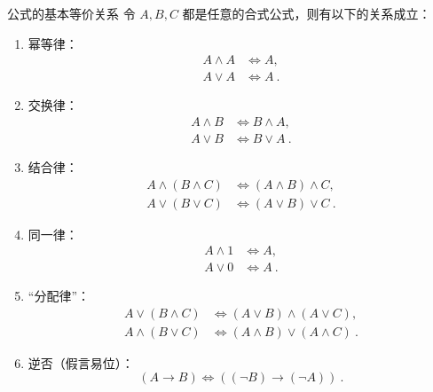 
\begin{theorem}{公式的基本等价关系}
令 $A, B, C$ 都是任意的合式公式，则有以下的关系成立：
\begin{enumerate}
\item 幂等律：
\begin{equation}
\begin{aligned}
A \land A &\Leftrightarrow A,\\
A \lor A &\Leftrightarrow A~.
\end{aligned}
\end{equation}
\item 交换律：
\begin{equation}
\begin{aligned}
A \land B &\Leftrightarrow B \land A,\\
A \lor B &\Leftrightarrow B \lor A ~.
\end{aligned}
\end{equation}
\item 结合律：
\begin{equation}
\begin{aligned}
A \land (B \land C) &\Leftrightarrow (A \land B) \land C, \\
A \lor (B \lor C) &\Leftrightarrow (A \lor B) \lor C ~.
\end{aligned}
\end{equation}
\item 同一律：
\begin{equation}
\begin{aligned}
A \land 1 &\Leftrightarrow A, \\
A \lor 0 &\Leftrightarrow A ~.
\end{aligned}
\end{equation}
\item “分配律”：
\begin{equation}
\begin{aligned}
A \lor (B \land C) &\Leftrightarrow (A \lor B) \land (A \lor C) ,\\
A \land (B \lor C) &\Leftrightarrow (A \land B) \lor (A \land C) ~.
\end{aligned}
\end{equation}
\item 逆否（假言易位）：
\begin{equation}
(A \to B) \Leftrightarrow ((\neg B) \to (\neg A)) ~.
\end{equation}

\end{enumerate}
\end{theorem}
